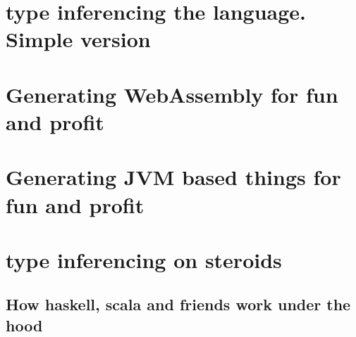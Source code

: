 \documentclass[11pt]{article}
\begin{document}
\section{type inferencing  the language. Simple version}
\label{sec:org6b39140}
\section{Generating WebAssembly for fun and profit}
\label{sec:orge3992d3}
\section{Generating JVM based things for fun and profit}
\label{sec:org310c061}
\section{type inferencing on steroids}
\label{sec:org67183f8}
\subsection{How haskell, scala and friends work under the hood}
\label{sec:org58e9a9b}
\end{document}
